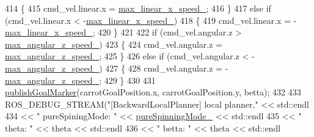 \begin{DoxyCode}
{414                 \{
415                     cmd\_vel.linear.x = \hyperlink{classcl__move__base__z_1_1backward__local__planner_1_1BackwardLocalPlanner_ae4399072e9ae9cc60d8837860dc4807b}{max\_linear\_x\_speed\_};
416                 \}
417                 \textcolor{keywordflow}{else} \textcolor{keywordflow}{if} (cmd\_vel.linear.x < -\hyperlink{classcl__move__base__z_1_1backward__local__planner_1_1BackwardLocalPlanner_ae4399072e9ae9cc60d8837860dc4807b}{max\_linear\_x\_speed\_})
418                 \{
419                     cmd\_vel.linear.x = -\hyperlink{classcl__move__base__z_1_1backward__local__planner_1_1BackwardLocalPlanner_ae4399072e9ae9cc60d8837860dc4807b}{max\_linear\_x\_speed\_};
420                 \}
421 
422                 \textcolor{keywordflow}{if} (cmd\_vel.angular.z > \hyperlink{classcl__move__base__z_1_1backward__local__planner_1_1BackwardLocalPlanner_af7e492339ee2d1c90c00f6dd4cf95551}{max\_angular\_z\_speed\_})
423                 \{
424                     cmd\_vel.angular.z = \hyperlink{classcl__move__base__z_1_1backward__local__planner_1_1BackwardLocalPlanner_af7e492339ee2d1c90c00f6dd4cf95551}{max\_angular\_z\_speed\_};
425                 \}
426                 \textcolor{keywordflow}{else} \textcolor{keywordflow}{if} (cmd\_vel.angular.z < -\hyperlink{classcl__move__base__z_1_1backward__local__planner_1_1BackwardLocalPlanner_af7e492339ee2d1c90c00f6dd4cf95551}{max\_angular\_z\_speed\_})
427                 \{
428                     cmd\_vel.angular.z = -\hyperlink{classcl__move__base__z_1_1backward__local__planner_1_1BackwardLocalPlanner_af7e492339ee2d1c90c00f6dd4cf95551}{max\_angular\_z\_speed\_};
429                 \}
430 
431                 \hyperlink{classcl__move__base__z_1_1backward__local__planner_1_1BackwardLocalPlanner_a70eaeb6cf31fd3378d9fbf9bcb975995}{publishGoalMarker}(carrotGoalPosition.x, carrotGoalPosition.y, betta);
432 
433                 ROS\_DEBUG\_STREAM(\textcolor{stringliteral}{"[BackwardLocalPlanner] local planner,"} << std::endl
434                                                                          << \textcolor{stringliteral}{" pureSpiningMode: "} << 
      \hyperlink{classcl__move__base__z_1_1backward__local__planner_1_1BackwardLocalPlanner_aebc89ccfa79fdf6bd45ba35134bec3fb}{pureSpinningMode\_} << std::endl
435                                                                          << \textcolor{stringliteral}{" theta: "} << theta << 
      std::endl
436                                                                          << \textcolor{stringliteral}{" betta: "} << theta << 
      std::endl
}
\end{DoxyCode}
